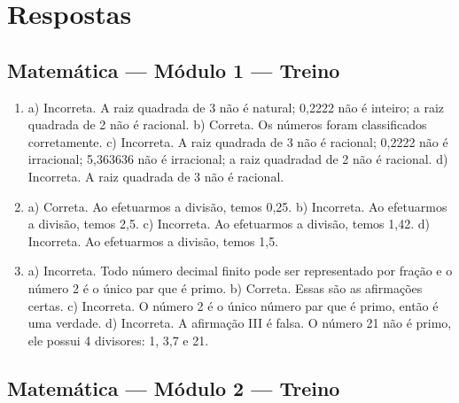 
\chapter{Respostas}

\footnotesize

\pagecolor{gray!40}

\section*{Matemática — Módulo 1 — Treino}

\begin{enumerate}
\item a) Incorreta. A raiz quadrada de 3 não é natural; 0,2222 não é inteiro; a raiz quadrada de 2 não é racional.
b) Correta. Os números foram classificados corretamente.
c) Incorreta. A raiz quadrada de 3 não é racional; 0,2222 não é irracional; 5,363636 não é irracional; a raiz quadradad de 2 não é racional.
d) Incorreta. A raiz quadrada de 3 não é racional.


\item a) Correta. Ao efetuarmos a divisão, temos 0,25.
b) Incorreta. Ao efetuarmos a divisão, temos 2,5.
c) Incorreta. Ao efetuarmos a divisão, temos 1,42.
d) Incorreta. Ao efetuarmos a divisão, temos 1,5.


\item a) Incorreta. Todo número decimal finito pode ser representado por fração e o número 2 é o único par que é primo.
b) Correta. Essas são as afirmações certas.
c) Incorreta. O número 2 é o único número par que é primo, então é uma verdade.
d) Incorreta. A afirmação III é falsa. O número 21 não é primo, ele possui 4 divisores: 1, 3,7 e 21.
\end{enumerate}

\section*{Matemática — Módulo 2 — Treino}

